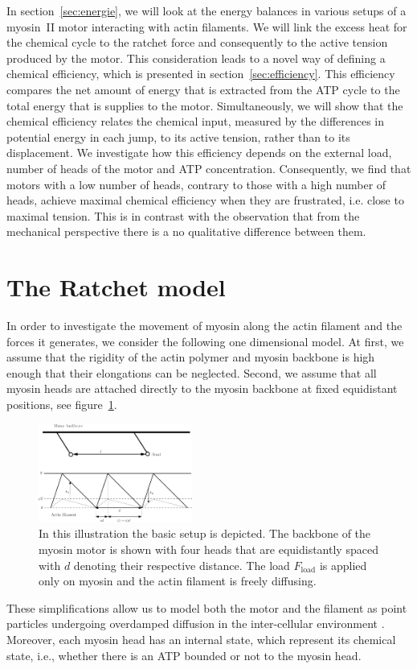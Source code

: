 \documentclass[aps,pre,twocolumn,showpacs,showkeys,superscriptaddress,floatfix]{revtex4-1}
\begin{document}
In section~\ref{sec:energie}, we will look at the energy balances in various setups of a myosin~II motor interacting with actin filaments.
We will link the excess heat for the chemical cycle to the ratchet force and consequently to the active tension produced by the motor.
This consideration leads to a novel way of defining a chemical efficiency, which is presented in section~\ref{sec:efficiency}. 
This efficiency compares the net amount of energy that is extracted from the ATP cycle to the total energy that is supplies to the motor.
Simultaneously, we will show that the chemical efficiency relates the chemical input, measured by the differences in potential energy in each jump, 
to its active tension, rather than to its displacement.
We investigate how this efficiency depends on the external load, number of heads of the motor and ATP concentration. 
Consequently, we find that motors with a low number of heads, contrary to those with a high number of heads, achieve maximal chemical efficiency when they are frustrated, i.e. close to maximal tension.
This is in contrast with the observation that from the mechanical perspective there is a no qualitative difference between them. 


\section{The Ratchet model}
\label{sec:ratchet}
In order to investigate the movement of myosin along the actin filament and the forces it generates, we consider the following one dimensional model.
At first, we assume that the rigidity of the actin polymer and myosin backbone is high enough that their elongations can be neglected.
Second, we assume that all myosin heads are attached directly to the myosin backbone at fixed equidistant positions, see figure~\ref{fig:ratchet_setup}.
\begin{figure}[t]
\centering
\includegraphics[width=0.45\textwidth,height=!]{ratchet_illustration}
\caption{
\label{fig:ratchet_setup}
In this illustration the basic setup is depicted.  
The backbone of the myosin motor is shown with four heads that are equidistantly spaced with $d$ denoting their respective distance. 
The load $F_\text{load}$ is applied only on myosin and the actin filament is freely diffusing. 
} 
\end{figure}
These simplifications allow us to model both the motor and the filament as point particles undergoing overdamped diffusion in the inter-cellular environment \cite{vanKampen1981stochastic}.
Moreover, each myosin head has an internal state, which represent its chemical state, 
i.e., whether there is an ATP bounded or not to the myosin head. 
\end{document}
